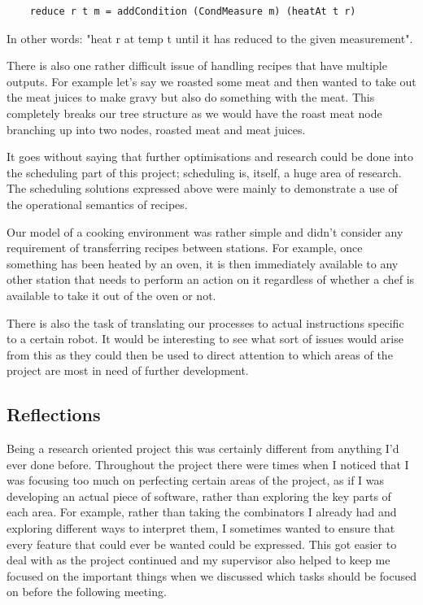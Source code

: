 \documentclass[11pt]{article}
\begin{document}
\begin{lstlisting}
    reduce r t m = addCondition (CondMeasure m) (heatAt t r)
\end{lstlisting}

In other words: "heat r at temp t until it has reduced to the given measurement".

\medbreak

There is also one rather difficult issue of handling recipes that have multiple
outputs. For example let's say we roasted some meat and then wanted to take out the
meat juices to make gravy but also do something with the meat. This completely breaks
our tree structure as we would have the roast meat node branching up into two nodes,
roasted meat and meat juices.

\medbreak

It goes without saying that further optimisations and research could be done into the
scheduling part of this project; scheduling is, itself, a huge area of research.
The scheduling solutions expressed above were mainly to demonstrate a use of
the operational semantics of recipes.

\medbreak

Our model of a cooking environment was rather simple and didn't consider any requirement
of transferring recipes between stations. For example, once something has been heated
by an oven, it is then immediately available to any other station that needs to perform
an action on it regardless of whether a chef is available to take it out of the oven or not.

\medbreak

There is also the task of translating our processes to actual instructions specific to a certain
robot. It would be interesting to see what sort of issues would arise from this as they could then
be used to direct attention to which areas of the project are most in need of further development.

\subsection{Reflections}

Being a research oriented project this was certainly different from anything I'd ever done before.
Throughout the project there were times when I noticed that I was focusing too much on perfecting
certain areas of the project, as if I was developing an actual piece of software, rather than
exploring the key parts of each area. For example, rather than taking the combinators I already
had and exploring different ways to interpret them, I sometimes wanted to ensure that every feature
that could ever be wanted could be expressed. This got easier to deal with as the project
continued and my supervisor also helped to keep me focused on the important things when we discussed
which tasks should be focused on before the following meeting.
\end{document}
